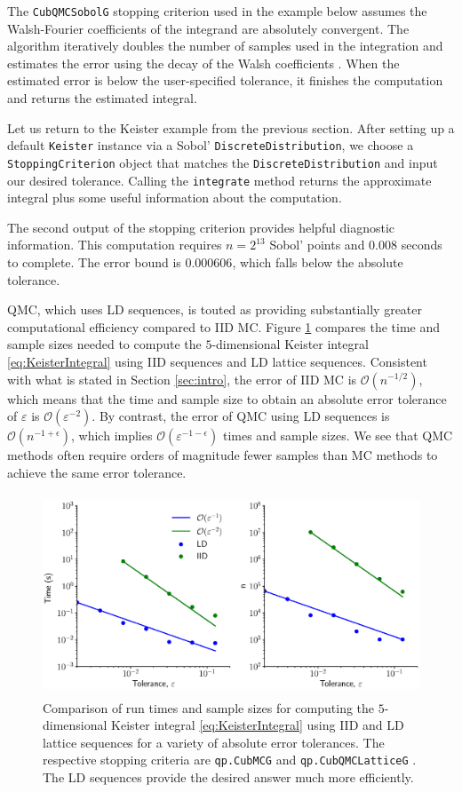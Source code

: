\documentclass[graybox]{svmult}
\begin{document}
The \texttt{CubQMCSobolG} stopping criterion used in the example below assumes the Walsh-Fourier coefficients of the integrand are absolutely convergent. The algorithm iteratively doubles the number of samples used in the integration and estimates the error using the decay of the Walsh coefficients \cite{HicJim16a}. When the estimated error is below the user-specified tolerance, it finishes the computation and returns the estimated integral.

Let us return to the Keister example from the previous section.  After setting up  a default \texttt{Keister} instance via a Sobol' \texttt{DiscreteDistribution}, we choose a \texttt{StoppingCriterion} object that matches the \texttt{DiscreteDistribution} and input our desired tolerance.  Calling the  \texttt{integrate} method returns the approximate integral plus some useful information about the computation.

The second output of the stopping criterion provides helpful diagnostic information.  This computation requires $n=2^{13}$ Sobol' points and $0.008$ seconds to complete.  The error bound is $0.000606$, which falls below the absolute tolerance.

QMC, which uses LD sequences, is touted as providing substantially greater computational efficiency compared to IID MC.
Figure \ref{fig:sc_comp} compares the time and sample sizes needed to compute the $5$-dimensional Keister integral \eqref{eq:KeisterIntegral} using IID sequences and LD lattice sequences. Consistent with what is stated in Section \ref{sec:intro}, the error of IID MC is $\mathcal{O}(n^{-1/2})$, which means that the time and sample size to obtain an absolute error tolerance of $\varepsilon$ is $\mathcal{O}(\varepsilon^{-2})$.  By contrast, the  error of QMC using LD sequences is $\mathcal{O}(n^{-1+\epsilon})$, which implies $\mathcal{O}(\varepsilon^{-1-\epsilon})$ times and sample sizes.  We see that QMC methods often require orders of magnitude fewer samples than MC methods to achieve the same error tolerance.

\begin{figure}[t]
	\includegraphics[height=6cm]{QMCSoftwareArticle/vfigs/sc_comp.eps}
	\caption{Comparison of run times and sample sizes for computing the $5$-dimensional Keister integral \eqref{eq:KeisterIntegral} using IID and LD lattice sequences for a variety of absolute error tolerances. The respective stopping criteria are  \texttt{qp.CubMCG} \cite{HicEtal14a} and  \texttt{qp.CubQMCLatticeG} \cite{JimHic16a}. The LD sequences provide the desired answer much more efficiently.}
	\label{fig:sc_comp}
\end{figure}
\end{document}
